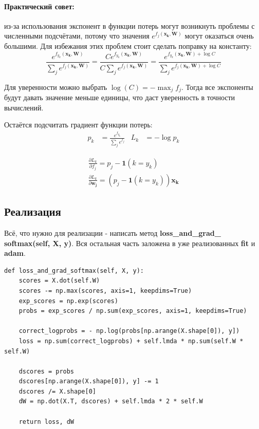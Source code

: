 \documentclass[a4paper]{article}
\newcommand{\xk}{\bm{x_k}}
\newcommand{\W}{\bm{W}}
\begin{document}
\paragraph*{Практический совет:} из-за использования экспонент в функции потерь могут возникнуть проблемы с численными подсчётами, потому что значения $e^{f_j(\xk, \W)}$ могут оказаться очень большими. Для избежания этих проблем стоит сделать поправку на константу:
\begin{equation}
\frac{e^{f_{y_k}(\xk, \W)}}{\sum_je^{f_j(\xk, \W)}} = \frac{Ce^{f_{y_k}(\xk, \W)}}{C\sum_je^{f_j(\xk, \W)}} = \frac{e^{f_{y_k}(\xk, \W) + \log C}}{\sum_je^{f_j(\xk, \W) + \log C}}
\end{equation}

Для уверенности можно выбрать $\log(C) = - \max_jf_j$. Тогда все экспоненты будут давать значение меньше единицы, что даст уверенность в точности вычислений.

Остаётся подсчитать градиент функции потерь:
\begin{align*}
p_k &= \frac{e^{f_{y_k}}}{\sum_je^{f_j}}     &       L_k &= -\log p_k
\end{align*}

\begin{eqnarray}
\frac{\partial L_k}{\partial f_j} = p_j - \bm{1}(k = y_k) \\
\frac{\partial L_k}{\partial \bm{w_j}} = \left(p_j - \bm{1}(k = y_k)\right) \xk
\end{eqnarray}

\subsection{Реализация}
Всё, что нужно для реализации - написать метод \textbf{loss\_and\_grad\_ softmax(self, X, y)}. Вся остальная часть заложена в уже реализованных \textbf{fit} и \textbf{adam}. 
\begin{lstlisting}
def loss_and_grad_softmax(self, X, y):
	scores = X.dot(self.W)
	scores -= np.max(scores, axis=1, keepdims=True)
	exp_scores = np.exp(scores)
	probs = exp_scores / np.sum(exp_scores, axis=1, keepdims=True)
	
	correct_logprobs = - np.log(probs[np.arange(X.shape[0]), y])
	loss = np.sum(correct_logprobs) + self.lmda * np.sum(self.W * self.W)
        
	dscores = probs
	dscores[np.arange(X.shape[0]), y] -= 1
	dscores /= X.shape[0]
	dW = np.dot(X.T, dscores) + self.lmda * 2 * self.W
        
	return loss, dW
\end{lstlisting}
\end{document}
